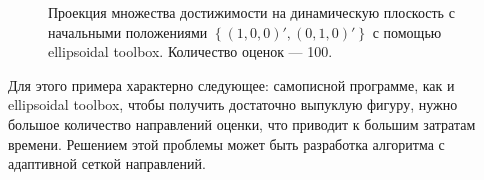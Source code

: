 \documentclass[10pt, a4paper]{article}
\begin{document}
\begin{figure}[H]
\caption{Проекция множества достижимости на динамическую плоскость с начальными положениями $\left\{(1,0,0)',(0,1,0)'\right\}$ с помощью ellipsoidal toolbox. Количество оценок --- 100.}
\end{figure}

Для этого примера характерно следующее: самописной программе, как и ellipsoidal toolbox, чтобы получить достаточно выпуклую фигуру, нужно большое количество направлений оценки, что приводит к большим затратам времени. Решением этой проблемы может быть разработка алгоритма с адаптивной сеткой направлений.
\end{document}
